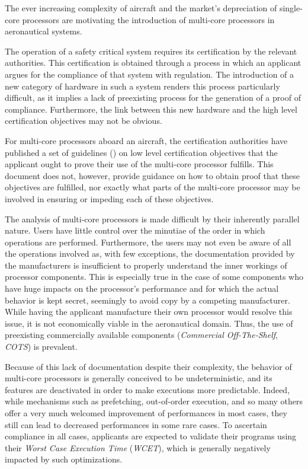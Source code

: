 The ever increasing complexity of aircraft and the market's depreciation of
single-core processors are motivating the introduction of multi-core processors
in aeronautical systems.

The operation of a safety critical system requires its certification by the
relevant authorities. This certification is obtained through a process in which
an applicant argues for the compliance of that system with regulation. The
introduction of a new category of hardware in such a system renders this process
particularly difficult, as it implies a lack of preexisting process for the
generation of a proof of compliance. Furthermore, the link between this new
hardware and the high level certification objectives may not be obvious.

For multi-core processors aboard an aircraft, the certification authorities
have published a set of guidelines (\cite{cast32A}) on low level certification
objectives that the applicant ought to prove their use of the multi-core
processor fulfills. This document does not, however, provide guidance on how to
obtain proof that these objectives are fulfilled, nor exactly what parts of the
multi-core processor may be involved in ensuring or impeding each of these
objectives.

The analysis of multi-core processors is made difficult by their inherently
parallel nature. Users have little control over the minutiae of the order in
which operations are performed. Furthermore, the users may not even be aware of
all the operations involved as, with few exceptions, the documentation provided
by the manufacturers is insufficient to properly understand the inner workings
of processor components. This is especially true in the case of some components
who have huge impacts on the processor's performance and for which the actual
behavior is kept secret, seemingly to avoid copy by a competing manufacturer.
While having the applicant manufacture their own processor would resolve this
issue, it is not economically viable in the aeronautical domain. Thus, the use
of preexisting commercially available components (\textit{Commercial
Off-The-Shelf}, \textit{COTS}) is prevalent.

Because of this lack of documentation despite their complexity, the behavior of
multi-core processors is generally conceived to be undeterministic, and its
features are deactivated in order to make executions more predictable. Indeed,
while mechanisms such as prefetching, out-of-order execution, and so many
others offer a very much welcomed improvement of performances in most cases,
they still can lead to decreased performances in some rare cases. To ascertain
compliance in all cases, applicants are expected to validate their programs
using their \textit{Worst Case Execution Time} (\textit{WCET}), which is
generally negatively impacted by such optimizations.

